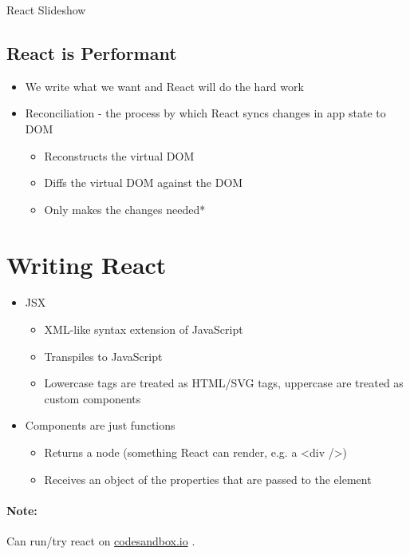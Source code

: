 \begin{code}
	\inputminted{js}{src2/9-slideshowComponents.js}
	\caption{React Slideshow}
\end{code}

\subsection{React is Performant}
\begin{itemize}
	\item We write what we want and React will do the hard work
	\item Reconciliation - the process by which React syncs changes in
	      app state to DOM
	      \begin{itemize}
		      \item Reconstructs the virtual DOM
		      \item Diffs the virtual DOM against the DOM
		      \item Only makes the changes needed*
	      \end{itemize}
\end{itemize}

\section{Writing React}
\begin{itemize}
	\item JSX
	      \begin{itemize}
		      \item XML-like syntax extension of JavaScript
		      \item Transpiles to JavaScript
		      \item Lowercase tags are treated as HTML/SVG tags, uppercase are
		            treated as custom components
	      \end{itemize}
	      \clearpage
	\item Components are just functions
	      \begin{itemize}
		      \item Returns a node (something React can render, e.g. a <div />)
		      \item Receives an object of the properties that are passed to the
		            element
	      \end{itemize}
\end{itemize}
\paragraph{Note:} Can run/try react on \href{https://codesandbox.io}{codesandbox.io} .

